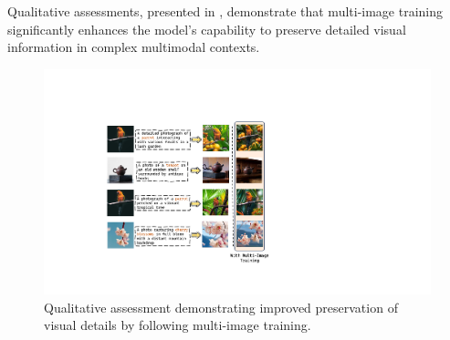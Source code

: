 Qualitative assessments, presented in , demonstrate that multi-image training significantly enhances the model's capability to preserve detailed visual information in complex multimodal contexts.

\begin{figure}[t]
\centering
\includegraphics[width=1.0\textwidth]{figures/multi_exp.pdf}
\caption{Qualitative assessment demonstrating improved preservation of visual details by \model following multi-image training.}
\label{fig:multi}
\end{figure}

